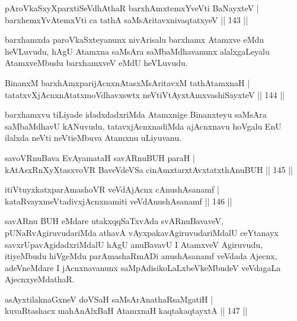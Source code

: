 \begin{shl}
pAroVkaSxyXparxtiSeVdhAthaR barxhAmx\s \s temxYveVti BaNayxteV |\\
barxhemxYvA\s \s temxVti ca tathA saMsAritavxnivaqtatxyeV \hfill || 143 ||
\end{shl}

\begin{artha}
barxhamxda paroVkaSxteyanunx nivArisalu barxhamx Atamxve eMdu heVLuvudu, hAgU Atamxna saMsAra saMbaMdhavanunx alalxgaLeyalu AtamxveMbudu barxhamxveV eMdU heVLuvudu.
\end{artha}


\begin{shl}
BinanxM barxhAmxparijAcnxnAtasxMsAritavxM tathA\s \s tamxnaH |\\
tatatxvXjAcnxnAtatxmoVdhavxswtx neVtiVtAyxtAmx\s vashiSayxteV \hfill  || 144 ||
\end{shl}

\begin{artha}
barxhamxvu tiLiyade idadxdadxriMda Atamxnige Binanxteyu saMsAra
saMbaMdhavU kANuvudu, tatavxjAcnxnadiMda ajAcnxnavu hoVgalu EnU
ilalxda neVti neVtieMbuva Atamxnu uLiyuvanu.
\end{artha}


\begin{shl}
savoVR\s nuBava EvAyamataH savARnuBUH paraH |\\
kAtAsxRnXyXtasxvoVR BaveVdeVSa cinAmxtarxtAvxtatxthA\s nuBUH \hfill || 145 ||
\end{shl}
\begin{shl}
itiVtuyxkatxparAmashoVR veVdAjAcnx cAnushAsanamf |\\
kataRvayxmeVtadivxjAcnxnamiti veVdAnushAsanamf \hfill || 146 ||
\end{shl}

\begin{artha}
savARnu BUH eMdare utakxqqSaTxvAda svARnuBavaveV, pUNaRvAgiruvudariMda
athavA vAyxpakavAgiruvudariMdalU ceYtanayx savxrUpavAgidadxriMdalU
hAgU anuBavavU I AtamxveV Agiruvudu, itiyeMbudu hiVgeMdu
parAmashaRmADi anushAsanamf veVdada Ajecnx, adeVneMdare I
jAcnxnavanunx saMpAdisikoLaLxbeVkeMbudeV veVdagaLa AjecnxyeMdathaR.
\end{artha}

\begin{shl}
asAyxtilaknaGxneV doVSaH saMsArAnathaRsaMgatiH |\\
kuvaRtashacx mahAnAlxBaH AtamxnaH kaqtakaqtayxtA \hfill || 147 ||
\end{shl}

